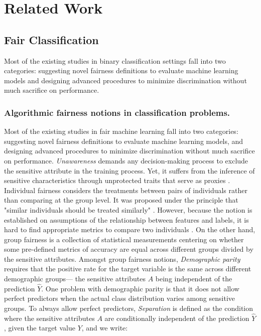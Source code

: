 \section{Related Work}
\label{sect:Related Work}

\subsection{Fair Classification}


Most of the existing studies in binary classification settings fall into two categories: suggesting novel fairness definitions to evaluate machine learning models and designing advanced procedures to minimize discrimination without much sacrifice on performance. 
 
\subsubsection{Algorithmic fairness notions in classification problems.}
Most of the existing studies in fair machine learning fall into two categories: suggesting novel fairness definitions to evaluate machine learning models, and designing advanced procedures to minimize discrimination without much sacrifice on performance. \emph{Unawareness} \cite{grgic2016case} demands any decision-making process to exclude the sensitive attribute in the training process. Yet, it suffers from the inference of sensitive characteristics through unprotected traits that serve as proxies \cite{corbett2018measure}. Individual fairness considers the treatments between pairs of individuals rather than comparing at the group level. It was proposed under the principle that "similar individuals should be treated similarly" \cite{dwork2012fairness}. However, because the notion is established on assumptions of the relationship between features and labels, it is hard to find appropriate metrics to compare two individuals \cite{chouldechova2020snapshot}. On the other hand, group fairness is a collection of statistical measurements centering on whether some pre-defined metrics of accuracy are equal across different groups divided by the sensitive attributes. Amongst group fairness notions, \emph{Demographic parity} \cite{dwork2012fairness} requires that the positive rate for the target variable is the same across different demographic groups--- the sensitive attributes $A$ being independent of the prediction $\hat{Y}$. One problem with demographic parity is that it does not allow perfect predictors when the actual class distribution varies among sensitive groups. To always allow perfect predictors, \emph{Separation} is defined as the condition where the sensitive attributes $A$ are conditionally independent of the prediction $\hat{Y}$, given the target value $Y$, and we write:
